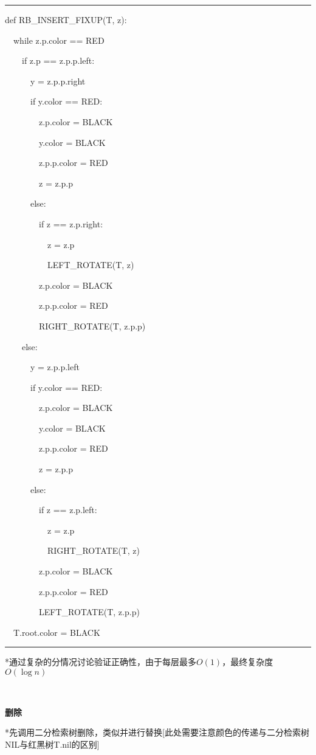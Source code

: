 \documentclass[a4paper,UTF8,fontset=windows]{ctexart}
\newenvironment{code}{\rule{36em}{0.1em}\setlength{\parindent}{1em}

}{

\setlength{\parindent}{0em}\rule{36em}{0.1em}}
\begin{document}
\begin{code}
def RB\_INSERT\_FIXUP(T, z):

\ \ while z.p.color == RED

\ \ \ \ if z.p == z.p.p.left:

\ \ \ \ \ \ y = z.p.p.right

\ \ \ \ \ \ if y.color == RED:

\ \ \ \ \ \ \ \ z.p.color = BLACK

\ \ \ \ \ \ \ \ y.color = BLACK

\ \ \ \ \ \ \ \ z.p.p.color = RED

\ \ \ \ \ \ \ \ z = z.p.p

\ \ \ \ \ \ else:

\ \ \ \ \ \ \ \ if z == z.p.right:

\ \ \ \ \ \ \ \ \ \ z = z.p

\ \ \ \ \ \ \ \ \ \ LEFT\_ROTATE(T, z)

\ \ \ \ \ \ \ \ z.p.color = BLACK

\ \ \ \ \ \ \ \  z.p.p.color = RED

\ \ \ \ \ \ \ \  RIGHT\_ROTATE(T, z.p.p)

\ \ \ \ else:

\ \ \ \ \ \ y = z.p.p.left

\ \ \ \ \ \ if y.color == RED:

\ \ \ \ \ \ \ \ z.p.color = BLACK

\ \ \ \ \ \ \ \ y.color = BLACK

\ \ \ \ \ \ \ \ z.p.p.color = RED

\ \ \ \ \ \ \ \ z = z.p.p

\ \ \ \ \ \ else:

\ \ \ \ \ \ \ \ if z == z.p.left:

\ \ \ \ \ \ \ \ \ \ z = z.p

\ \ \ \ \ \ \ \ \ \ RIGHT\_ROTATE(T, z)

\ \ \ \ \ \ \ \ z.p.color = BLACK

\ \ \ \ \ \ \ \ z.p.p.color = RED

\ \ \ \ \ \ \ \ LEFT\_ROTATE(T, z.p.p)

\ \ T.root.color = BLACK
\end{code}

*\hspace{0em}通过复杂的分情况讨论验证正确性，由于每层最多$O(1)$，最终复杂度$O(\log n)$

\

\textbf{删除}

*\hspace{0em}先调用二分检索树删除，类似并进行替换[此处需要注意颜色的传递与二分检索树NIL与红黑树T.nil的区别]
\end{document}
